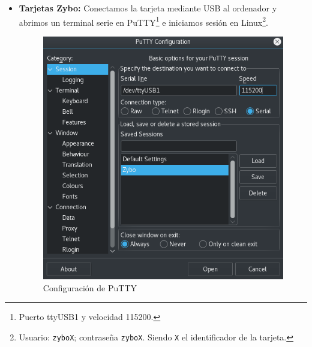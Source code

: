 \begin{itemize}
	\newpage
	\item \textbf{Tarjetas Zybo:} Conectamos la tarjeta mediante USB al ordenador y abrimos un terminal serie en PuTTY\footnote{Puerto ttyUSB1 y velocidad 115200.} e iniciamos sesión en Linux\footnote{Usuario: \texttt{zyboX}; contraseña \texttt{zyboX}. Siendo \texttt{X} el identificador de la tarjeta.}.
	
	\begin{figure}[h]
		\centering
		\includegraphics[scale=0.7]{Anexos/Anexo2/Infraestructura/PuTTY.png}
		\caption{Configuración de PuTTY}
		\label{Configuración de PuTTY}
	\end{figure}
	

\end{itemize}
